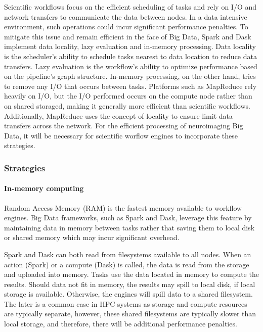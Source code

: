             
            Scientific workflows focus on the efficient scheduling of tasks and
            rely on I/O and network transfers to communicate the data between
            nodes. In a data intensive environment, such operations could incur
            significant performance penalties. To mitigate this issue and remain
            efficient in the face of Big Data, Spark and Dask implement data
            locality, lazy evaluation and in-memory processing. Data locality is
            the scheduler's ability to schedule tasks nearest to data location
            to reduce data transfers. Lazy evaluation is the workflow's ability
            to optimize performance based on the pipeline's graph structure.
            In-memory processing, on the other hand, tries to remove any I/O
            that occurs between tasks. Platforms such as MapReduce rely heavily
            on I/O, but the I/O performed occurs on the compute node rather than
            on shared storaged, making it generally more efficient than
            scientific workflows. Additionally, MapReduce uses the concept of
            locality to ensure limit data transfers across the network. For the
            efficient processing of neuroimaging Big Data, it will be necessary
            for scientific worflow engines to incorporate these strategies.
        

            \subsubsection{Strategies}
                \paragraph{In-memory computing}
                    Random Access Memory (RAM) is the fastest memory available
                    to workflow engines. Big Data frameworks, such as Spark and
                    Dask, leverage this feature by maintaining data in memory
                    between tasks rather that saving them to local disk or
                    shared memory which may incur significant overhead.

                    Spark and Dask can both read from filesystems available to
                    all nodes. When an action (Spark) or a compute (Dask) is
                    called, the data is read from the storage and uploaded into
                    memory. Tasks use the data located in memory to compute the
                    results. Should data not fit in memory, the results may
                    spill to local disk, if local storage is available.
                    Otherwise, the engines will spill data to a shared
                    filesystem. The later is a common case in HPC systems as
                    storage and compute resources are typically separate,
                    however, these shared filesystems are typically slower than
                    local storage, and therefore, there will be additional
                    performance penalties.

